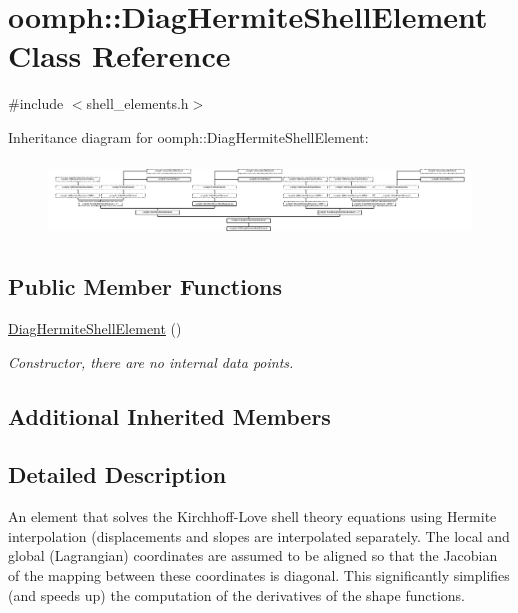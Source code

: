 \hypertarget{classoomph_1_1DiagHermiteShellElement}{}\section{oomph\+:\+:Diag\+Hermite\+Shell\+Element Class Reference}
\label{classoomph_1_1DiagHermiteShellElement}


{\ttfamily \#include $<$shell\+\_\+elements.\+h$>$}

Inheritance diagram for oomph\+:\+:Diag\+Hermite\+Shell\+Element\+:\begin{figure}[H]
\begin{center}
\leavevmode
\includegraphics[height=2.031746cm]{classoomph_1_1DiagHermiteShellElement}
\end{center}
\end{figure}
\subsection*{Public Member Functions}
\begin{DoxyCompactItemize}
\item 
\hyperlink{classoomph_1_1DiagHermiteShellElement_afbc92280d72ec2f840d76014ed623d1b}{Diag\+Hermite\+Shell\+Element} ()
\begin{DoxyCompactList}\small\item\em Constructor, there are no internal data points. \end{DoxyCompactList}\end{DoxyCompactItemize}
\subsection*{Additional Inherited Members}


\subsection{Detailed Description}
An element that solves the Kirchhoff-\/\+Love shell theory equations using Hermite interpolation (displacements and slopes are interpolated separately. The local and global (Lagrangian) coordinates are assumed to be aligned so that the Jacobian of the mapping between these coordinates is diagonal. This significantly simplifies (and speeds up) the computation of the derivatives of the shape functions. 


